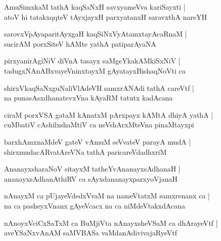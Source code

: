 \documentclass[twoside,12pt,openright]{book}
\newcounter{shloka}[chapter]
\begin{document}
\begin{shloka}%
AmuSimxkaM tathA kaqSaNxH savxyameVva kariSayxti |\\
atoV hi tatakxqqteV tAyxjayxH parxyatanxH saravxthA nareYH
\end{shloka}

\begin{shloka}%
sarovxVpAyaparitAyxgaH kaqSiNxVyAtamxtayAcaRnaM |\\
sucirAM porxSiteV hAMte yathA patiparAyaNA
\end{shloka}

\begin{shloka}%
pirxyanirAgiNiV diVnA tasayx saMgeYkakAMkiSxNiV |\\
tadugxNAnABxvayeVninxtayxM gAyatayxBishaqNoVti ca 
\end{shloka}

\begin{shloka}%
shirxVkaqSaNxguNaliVlAdeVH samxrANAdi tathA careVtf |\\
na punasAsxdhanatevxVna kAyaRM tatutx kadAcana 
\end{shloka}

\begin{shloka}%
ciraM porxVSA gataM kAnatxM pArxpayx kAMtA dhiyA yathA |\\
cuMbatiV cAshilxshaMtiV ca neVshArxMteVna pinaMtayxpi 
\end{shloka}

\begin{shloka}%
barxhAmxnaMdeV gateV vAmuM seVvateV parayA mudA |\\
shirxmudacARvatAreVNa tathA paricareVdadhxriM
\end{shloka}

\begin{shloka}%
AnanayxsharaNoV sitayxM tatheYvAnanayxsAdhanaH |\\
ananayxsAdhanAthiRV ca sAyxdananayxparxyoVjanaH 
\end{shloka}

\begin{shloka}%
nAnayxM ca pUjayeVdedxVvaM na nameVtatxM samxrenanx ca |\\
na ca pasheyxVnanx gAyeVcacx na ca niMdeVtakxdAcana 
\end{shloka}

\begin{shloka}%
nAnoyxVciCxSaTxM ca BuMjiVta nAnayxsheVSaM ca dhArayeVtf |\\
aveYSaNxvAnAM saMVBASa vaMdanAdivivajaRyeVtf 
\end{shloka}
\end{document}
